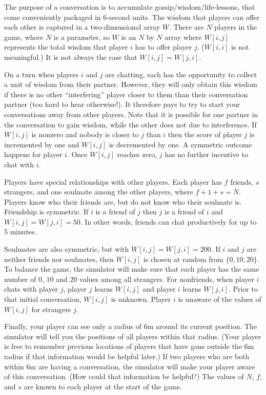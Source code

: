 The purpose of a conversation is to accumulate
gossip/wisdom/life-lessons, that come conveniently packaged in
6-second units.  The wisdom that players can offer each other is
captured in a two-dimensional array $W$.  There are $N$ players in the
game, where $N$ is a parameter, so $W$ is an $N$ by $N$ array where
$W[i,j]$ represents the total wisdom that player $i$ has to offer
player $j$. ($W[i,i]$ is not meaningful.)  It is not always the case
that $W[i,j]=W[j,i]$. 

On a turn when players $i$ and $j$ are chatting, each has the
opportunity to collect a unit of wisdom from their partner.  However,
they will only obtain this wisdom if there is no other ``interfering''
player closer to them than their conversation partner (too hard to
hear otherwise!). It therefore pays to try to start your conversations
away from other players.  Note that it is possible for one
partner in the conversation to gain wisdom, while the other does not
due to interference.  If $W[i,j]$ is nonzero and nobody is closer to
$j$ than $i$ then the score of player $j$ is incremented by one and
$W[i,j]$ is decremented by one. A symmetric outcome happens for player
$i$. Once $W[i,j]$ reaches zero, $j$ has no further incentive to chat
with $i$.

Players have special relationships with other players.  Each player
has $f$ friends, $s$ strangers, and one soulmate among the other
players, where $f+1+s = N$. Players know who their friends are, but do
not know who their soulmate is.  Friendship is symmetric.  If $i$ is a
friend of $j$ then $j$ is a friend of $i$ and $W[i,j]=W[j,i]=50$. In
other words, friends can chat productively for up to 5 minutes.

Soulmates are also symmetric, but with $W[i,j]=W[j,i]=200$.  If $i$
and $j$ are neither friends nor soulmates, then $W[i,j]$ is chosen at
random from $\{ 0, 10, 20 \}$. To balance the game, the simulator will
make sure that each player has the same number of $0$, $10$ and $20$
values among all strangers. For nonfriends, when player $i$ chats with
player $j$, player $j$ learns $W[i,j]$ and player $i$ learns
$W[j,i]$. Prior to that initial conversation, $W[i,j]$ is unknown.
Player $i$ is unaware of the values of $W[i,j]$ for strangers $j$.

Finally, your player can see only a radius of 6m around its current position.
The simulator will tell you the positions of all players within that radius.
(Your player is free to remember previous locations of players that have
gone outside the 6m radius if that
information would be helpful later.) If two players who are both within
6m are having a conversation, the simulator will make your player aware
of this conversation. (How could that information be helpful?)
The values of $N$, $f$, and $s$ are known to each player at the start of the game.

